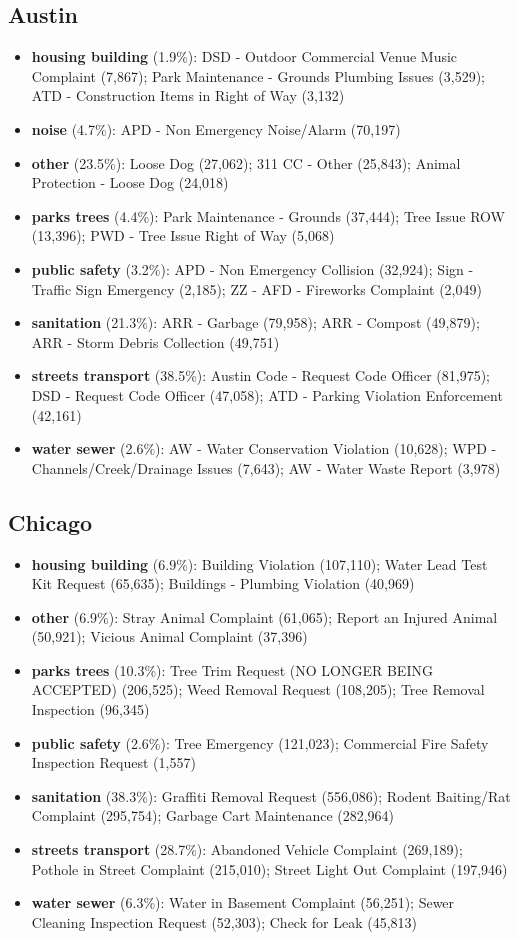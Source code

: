 \subsection*{Austin}
\begin{itemize}
\item \textbf{housing building} (1.9\%): DSD - Outdoor Commercial Venue Music Complaint (7,867); Park Maintenance - Grounds Plumbing Issues (3,529); ATD - Construction Items in Right of Way (3,132)
\item \textbf{noise} (4.7\%): APD - Non Emergency Noise/Alarm (70,197)
\item \textbf{other} (23.5\%): Loose Dog (27,062); 311 CC - Other (25,843); Animal Protection - Loose Dog (24,018)
\item \textbf{parks trees} (4.4\%): Park Maintenance - Grounds (37,444); Tree Issue ROW (13,396); PWD - Tree Issue Right of Way (5,068)
\item \textbf{public safety} (3.2\%): APD - Non Emergency Collision (32,924); Sign - Traffic Sign Emergency (2,185); ZZ - AFD - Fireworks Complaint (2,049)
\item \textbf{sanitation} (21.3\%): ARR - Garbage (79,958); ARR - Compost (49,879); ARR - Storm Debris Collection (49,751)
\item \textbf{streets transport} (38.5\%): Austin Code - Request Code Officer (81,975); DSD - Request Code Officer (47,058); ATD - Parking Violation Enforcement (42,161)
\item \textbf{water sewer} (2.6\%): AW - Water Conservation Violation (10,628); WPD - Channels/Creek/Drainage Issues (7,643); AW - Water Waste Report (3,978)
\end{itemize}
\subsection*{Chicago}
\begin{itemize}
\item \textbf{housing building} (6.9\%): Building Violation (107,110); Water Lead Test Kit Request (65,635); Buildings - Plumbing Violation (40,969)
\item \textbf{other} (6.9\%): Stray Animal Complaint (61,065); Report an Injured Animal (50,921); Vicious Animal Complaint (37,396)
\item \textbf{parks trees} (10.3\%): Tree Trim Request (NO LONGER BEING ACCEPTED) (206,525); Weed Removal Request (108,205); Tree Removal Inspection (96,345)
\item \textbf{public safety} (2.6\%): Tree Emergency (121,023); Commercial Fire Safety Inspection Request (1,557)
\item \textbf{sanitation} (38.3\%): Graffiti Removal Request (556,086); Rodent Baiting/Rat Complaint (295,754); Garbage Cart Maintenance (282,964)
\item \textbf{streets transport} (28.7\%): Abandoned Vehicle Complaint (269,189); Pothole in Street Complaint (215,010); Street Light Out Complaint (197,946)
\item \textbf{water sewer} (6.3\%): Water in Basement Complaint (56,251); Sewer Cleaning Inspection Request (52,303); Check for Leak (45,813)
\end{itemize}
